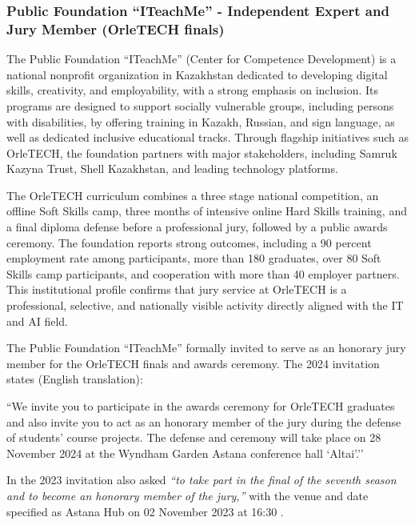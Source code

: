 \subsubsection{Public Foundation ``ITeachMe'' - Independent Expert and Jury Member (OrleTECH finals)}

\label{subsubsec:JudgingITeachMeNew}

The Public Foundation ``ITeachMe'' (Center for Competence Development) is a national nonprofit organization in Kazakhstan dedicated to developing digital skills, creativity, and employability, with a strong emphasis on inclusion. Its programs are designed to support socially vulnerable groups, including persons with disabilities, by offering training in Kazakh, Russian, and sign language, as well as dedicated inclusive educational tracks. Through flagship initiatives such as OrleTECH, the foundation partners with major stakeholders, including Samruk Kazyna Trust, Shell Kazakhstan, and leading technology platforms.

The OrleTECH curriculum combines a three stage national competition, an offline Soft Skills camp, three months of intensive online Hard Skills training, and a final diploma defense before a professional jury, followed by a public awards ceremony. The foundation reports strong outcomes, including a 90 percent employment rate among participants, more than 180 graduates, over 80 Soft Skills camp participants, and cooperation with more than 40 employer partners. This institutional profile confirms that jury service at OrleTECH is a professional, selective, and nationally visible activity directly aligned with the IT and AI field.

The Public Foundation ``ITeachMe'' formally invited \mrl{} to serve as an honorary jury member for the OrleTECH finals and awards ceremony. The 2024 invitation states (English translation):
\begin{fullquote}
``We invite you to participate in the awards ceremony for OrleTECH graduates and also invite you to act as an honorary member of the jury during the defense of students’ course projects. The defense and ceremony will take place on 28 November 2024 at the Wyndham Garden Astana conference hall `Altai’.'' 
\end{fullquote}

In the 2023 invitation also asked \mrl{} \emph{``to take part in the final of the seventh season and to become an honorary member of the jury,''} with the venue and date specified as Astana Hub on 02 November 2023 at 16:30 .

